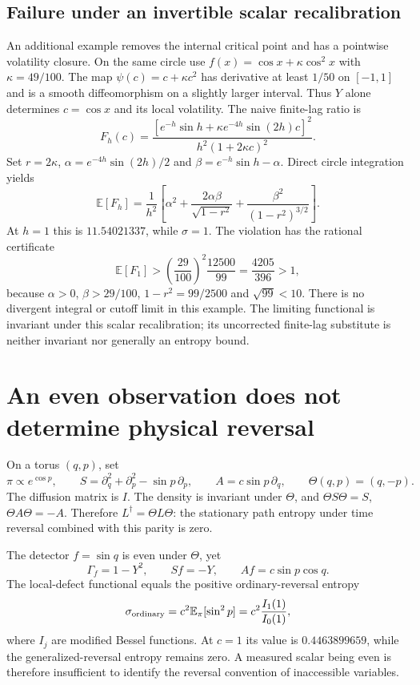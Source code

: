 \subsection{Failure under an invertible scalar recalibration}
An additional example removes the internal critical point and has a pointwise
volatility closure. On the same circle use
$f(x)=\cos x+\kappa\cos^2x$ with $\kappa=49/100$.
The map $\psi(c)=c+\kappa c^2$ has derivative at least $1/50$ on $[-1,1]$
and is a smooth diffeomorphism on a slightly larger interval. Thus $Y$ alone
determines $c=\cos x$ and its local volatility. The naive finite-lag ratio is
\[
 F_h(c)=\frac{[e^{-h}\sin h+\kappa e^{-4h}\sin(2h)c]^2}
 {h^2(1+2\kappa c)^2}.
\]
Set $r=2\kappa$, $\alpha=e^{-4h}\sin(2h)/2$ and
$\beta=e^{-h}\sin h-\alpha$. Direct circle integration yields
\[
 \mathbb E[F_h]=\frac1{h^2}\left[
 \alpha^2+\frac{2\alpha\beta}{\sqrt{1-r^2}}
 +\frac{\beta^2}{(1-r^2)^{3/2}}\right].
\]
At $h=1$ this is $11.54021337$, while $\sigma=1$.
The violation has the rational certificate
\[
 \mathbb E[F_1]>
 \left(\frac{29}{100}\right)^2\frac{12500}{99}
 =\frac{4205}{396}>1,
\]
because $\alpha>0$, $\beta>29/100$, $1-r^2=99/2500$ and $\sqrt{99}<10$.
There is no divergent integral or cutoff limit in this example. The limiting
functional is invariant under this scalar recalibration; its uncorrected
finite-lag substitute is neither invariant nor generally an entropy bound.

\section{An even observation does not determine physical reversal}
On a torus $(q,p)$, set
\[
 \pi\propto e^{\cos p},\qquad
 S=\partial_q^2+\partial_p^2-\sin p\,\partial_p,
 \qquad A=c\sin p\,\partial_q,
 \qquad \Theta(q,p)=(q,-p).
\]
The diffusion matrix is $I$. The density is invariant under $\Theta$, and
$\Theta S\Theta=S$, $\Theta A\Theta=-A$. Therefore
$L^\dagger=\Theta L\Theta$: the stationary path entropy under time reversal
combined with this parity is zero.

The detector $f=\sin q$ is even under $\Theta$, yet
\[
 \Gamma_f=1-Y^2,\qquad Sf=-Y,\qquad Af=c\sin p\cos q.
\]
The local-defect functional equals the positive ordinary-reversal entropy
\[
 \sigma_{\rm ordinary}
 =c^2\mathbb E_\pi[\sin^2p]
 =c^2\frac{I_1(1)}{I_0(1)},
\]
where $I_j$ are modified Bessel functions. At $c=1$ its value is
$0.4463899659$, while the generalized-reversal entropy remains zero.
A measured scalar being even is therefore insufficient to identify the
reversal convention of inaccessible variables.


